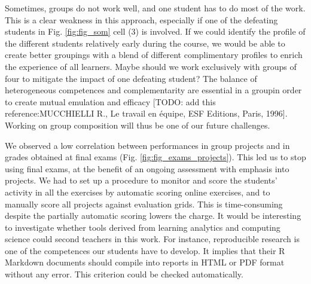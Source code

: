 \documentclass{aims}
\theoremstyle{definition}
\begin{document}
Sometimes, groups do not work well, and one student has to do most of
the work. This is a clear weakness in this approach, especially if one
of the defeating students in Fig. \ref {fig:fig_som} cell (3) is
involved. If we could identify the profile of the different students
relatively early during the course, we would be able to create better
groupings with a blend of different complimentary profiles to enrich the
experience of all learners. Maybe should we work exclusively with groups
of four to mitigate the impact of one defeating student? The balance of
heterogeneous competences and complementarity are essential in a groupin
order to create mutual emulation and efficacy {[}TODO: add this
reference:MUCCHIELLI R., Le travail en équipe, ESF Editions, Paris,
1996{]}. Working on group composition will thus be one of our future
challenges.

We observed a low correlation between performances in group projects and
in grades obtained at final exams (Fig. \ref {fig:fig_exams_projects}).
This led us to stop using final exams, at the benefit of an ongoing
assessment with emphasis into projects. We had to set up a procedure to
monitor and score the students' activity in all the exercises by
automatic scoring online exercises, and to manually score all projects
against evaluation grids. This is time-consuming despite the partially
automatic scoring lowers the charge. It would be interesting to
investigate whether tools derived from learning analytics and computing
science could second teachers in this work. For instance, reproducible
research is one of the competences our students have to develop. It
implies that their R Markdown documents should compile into reports in
HTML or PDF format without any error. This criterion could be checked
automatically.
\end{document}
